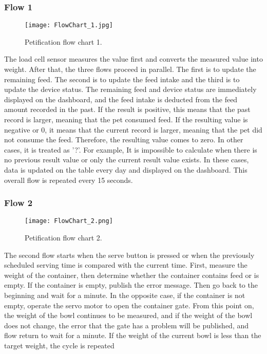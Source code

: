 \documentclass[conference]{IEEEtran}
\begin{document}
\subsubsection{Flow 1}
\begin{figure}[htbp]
\centerline{\texttt{[image: FlowChart\_1.jpg]}}
\caption{Petification flow chart 1.}
\label{fig}
\end{figure}
The load cell sensor measures the value first and converts the measured value into weight. After that, the three flows proceed in parallel. The first is to update the remaining feed. The second is to update the feed intake and the third is to update the device status.
The remaining feed and device status are immediately displayed on the dashboard, and the feed intake is deducted from the feed amount recorded in the past. If the result is positive, this means that the past record is larger, meaning that the pet consumed feed.
If the resulting value is negative or 0, it means that the current record is larger, meaning that the pet did not consume the feed. Therefore, the resulting value comes to zero. In other cases, it is treated as '?'. For example, It is impossible to calculate when there is no previous result value or only the current result value exists. In these cases, data is updated on the table every day and displayed on the dashboard. This overall flow is repeated every 15 seconds.

\hfill \break
\subsubsection{Flow 2}
\begin{figure}[htbp]
\centerline{\texttt{[image: FlowChart\_2.png]}}
\caption{Petification flow chart 2.}
\label{fig}
\end{figure}
The second flow starts when the serve button is pressed or when the previously scheduled serving time is compared with the current time.
First, measure the weight of the container, then determine whether the container contains feed or is empty. If the container is empty, publish the error message. Then go back to the beginning and wait for a minute.
In the opposite case, if the container is not empty, operate the servo motor to open the container gate. From this point on, the weight of the bowl continues to be measured, and if the weight of the bowl does not change, the error that the gate has a problem will be published, and flow return to wait for a minute.
If the weight of the current bowl is less than the target weight, the cycle is repeated
\end{document}
